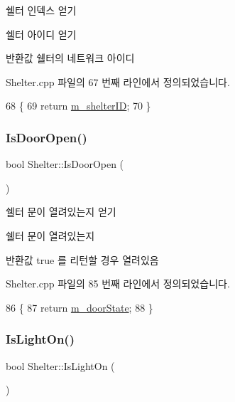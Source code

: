 쉘터 인덱스 얻기 

쉘터 아이디 얻기

\begin{DoxyReturn}{반환값}
쉘터의 네트워크 아이디 
\end{DoxyReturn}


Shelter.\+cpp 파일의 67 번째 라인에서 정의되었습니다.


\begin{DoxyCode}
68 \{
69     \textcolor{keywordflow}{return} \hyperlink{class_shelter_a158439448d67e4991a19dd7175a78a0b}{m\_shelterID};
70 \}
\end{DoxyCode}
\mbox{\label{class_shelter_a3cbedf84b7e783ba45d6a5bedb97916b}} 
\subsubsection{\texorpdfstring{Is\+Door\+Open()}{IsDoorOpen()}}
{\footnotesize\ttfamily bool Shelter\+::\+Is\+Door\+Open (\begin{DoxyParamCaption}{ }\end{DoxyParamCaption})}



쉘터 문이 열려있는지 얻기 

쉘터 문이 열려있는지

\begin{DoxyReturn}{반환값}
true 를 리턴할 경우 열려있음 
\end{DoxyReturn}


Shelter.\+cpp 파일의 85 번째 라인에서 정의되었습니다.


\begin{DoxyCode}
86 \{
87     \textcolor{keywordflow}{return} \hyperlink{class_shelter_a8deab51bd304b5cb728c2e739f5afa15}{m\_doorState};
88 \}
\end{DoxyCode}
\mbox{\label{class_shelter_a67c28ae706ebd1a9494e53cacdb5ea6e}} 
\subsubsection{\texorpdfstring{Is\+Light\+On()}{IsLightOn()}}
{\footnotesize\ttfamily bool Shelter\+::\+Is\+Light\+On (\begin{DoxyParamCaption}{ }\end{DoxyParamCaption})}



